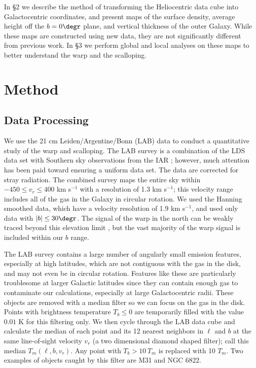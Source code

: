 \documentclass[apj]{emulateapj}
\begin{document}
   In \S 2 we describe the method of transforming the Heliocentric data cube into Galactocentric coordinates, and present maps of the surface density, average height off the $b=0\degr$ plane, and vertical thickness of the outer Galaxy. While these maps are constructed using new data, they are not significantly different from previous work.  In \S 3 we perform  global and local analyses on these maps to better understand the warp and the scalloping.  

\section{Method}\label{sec:proc}

\subsection{Data Processing}
We use the 21 cm Leiden/Argentine/Bonn (LAB) data  \citep{LAB,HB1997,BALMPK2005,ABLMP2000} to conduct  a quantitative study of  the warp and  scalloping. The LAB survey is a combination of the LDS data set \citep{HB1997} with Southern sky observations from the IAR \citep{ABLMP2000}; however, much attention has been paid toward ensuring a uniform data set. The data are corrected for stray radiation. The combined survey maps the entire sky within $-450\le v_r\le 400$ km s$^{-1}$ with a resolution of 1.3 km s$^{-1}$; this velocity range includes all of the gas in the Galaxy in circular rotation.  We used the Hanning smoothed  data, which have a velocity resolution of 1.9 km s$^{-1}$,  and used only data with  $|b|\le30\degr$. The signal of the warp in the north can be weakly traced beyond this elevation limit \citep{B1985}, but the vast majority of the warp signal is included within our $b$ range.

The LAB survey contains a large number of angularly small emission features, especially at high latitudes, which are not contiguous with the gas in the disk, and may not even be in circular rotation.  Features like these are particularly troublesome at larger Galactic latitudes since they can contain enough gas to  contaminate our calculations, especially at large Galactocentric radii.  These objects are removed with a median filter so we can focus on the gas in the disk. Points with brightness temperature $T_b\le 0$ are temporarily filled with the value $0.01$ K for this filtering only. We then cycle through the LAB data cube and 
calculate the median of each point and its 12 nearest neighbors  in $\ell$ and $b$ at the same line-of-sight velocity $v_r$ (a two dimensional diamond shaped filter); call this median $T_m(\ell,b,v_r)$. Any point with $T_b>10~T_m$ is replaced with 10 $T_m$. Two examples of objects  caught by this filter are M31 and NGC 6822.
\end{document}
